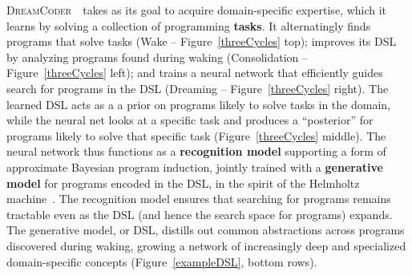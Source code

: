 \documentclass{article}
\newcommand{\system}{\textsc{DreamCoder}~}
\DeclareMathOperator*{\argmax}{arg\,max} %
\newcommand{\probability}{\mathds{P}} %
\begin{document}
\system~takes as its goal to acquire domain-specific expertise, which
it learns by solving a collection of programming \textbf{tasks}.  It
alternatingly finds programs that solve tasks (Wake --
Figure~\ref{threeCycles} top); improves its DSL by analyzing programs
found during waking (Consolidation -- Figure~\ref{threeCycles} left);
and trains a neural network that efficiently guides search for
programs in the DSL (Dreaming -- Figure~\ref{threeCycles} right).  The
learned DSL acts as a a prior on programs likely to solve tasks in the
domain, while the neural net looks at a specific task and produces a
``posterior'' for programs likely to solve that specific task
(Figure~\ref{threeCycles} middle).  The neural network thus functions
as a \textbf{recognition model} supporting a form of approximate
Bayesian program induction, jointly trained with a \textbf{generative
  model} for programs encoded in the DSL, in the spirit of the
Helmholtz machine~\cite{hinton1995wake}. The recognition model ensures
that searching for programs remains tractable even as the DSL (and
hence the search space for programs) expands.  The generative model,
or DSL, distills out common abstractions across programs discovered
during waking, growing a network of increasingly deep and specialized
domain-specific concepts (Figure~\ref{exampleDSL}, bottom rows).

\end{document}
